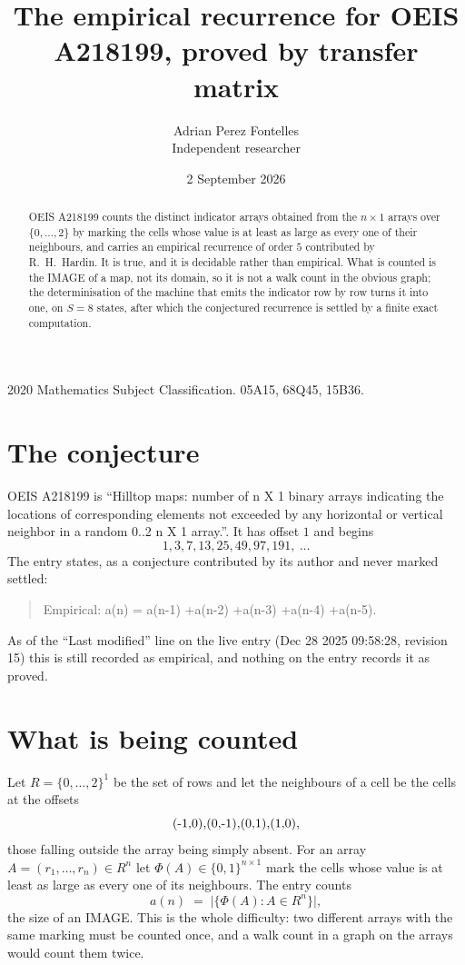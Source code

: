 \documentclass[11pt,a4paper]{article}
\title{The empirical recurrence for OEIS A218199, proved by transfer matrix}
\author{Adrian Perez Fontelles\\ \small Independent researcher}
\date{2 September 2026}
\theoremstyle{plain}
\theoremstyle{definition}
\begin{document}
\maketitle

\begin{abstract}
OEIS A218199 counts the distinct indicator arrays obtained from the $n\times1$ arrays over
$\{0,\dots,2\}$ by marking the cells whose value is at least as large as every one of their neighbours, and carries an
empirical recurrence of order $5$ contributed by R.~H.~Hardin. It is true, and it is
decidable rather than empirical. What is counted is the IMAGE of a map, not its domain, so it
is not a walk count in the obvious graph; the determinisation of the machine that emits the
indicator row by row turns it into one, on $S=8$ states, after which the conjectured
recurrence is settled by a finite exact computation.
\end{abstract}

\noindent\small 2020 Mathematics Subject Classification. 05A15, 68Q45, 15B36.\normalsize

\section{The conjecture}

OEIS A218199 is ``Hilltop maps: number of n X 1 binary arrays indicating the locations of corresponding elements not exceeded by any horizontal or vertical neighbor in a random 0..2 n X 1 array.''. It has offset $1$ and begins
\[
1, 3, 7, 13, 25, 49, 97, 191,\ \dots
\]
The entry states, as a conjecture contributed by its author and never marked settled:
\begin{quote}
Empirical: a(n) = a(n-1) +a(n-2) +a(n-3) +a(n-4) +a(n-5).
\end{quote}
As of the ``Last modified'' line on the live entry (Dec 28 2025 09:58:28, revision 15) this is still
recorded as empirical, and nothing on the entry records it as proved.

\section{What is being counted}

Let $R=\{0,\dots,2\}^{1}$ be the set of rows and let the neighbours of a cell be the
cells at the offsets
\[
$(-1,0)$, $(0,-1)$, $(0,1)$, $(1,0)$,
\]
those falling outside the array being simply absent. For an array
$A=(r_1,\dots,r_n)\in R^n$ let $\Phi(A)\in\{0,1\}^{n\times1}$ mark the cells whose value
is at least as large as every one of its neighbours. The entry counts
\[
a(n)\;=\;\bigl|\{\Phi(A):A\in R^n\}\bigr| ,
\]
the size of an IMAGE. This is the whole difficulty: two different arrays with the same marking
must be counted once, and a walk count in a graph on the arrays would count them twice.
\end{document}
